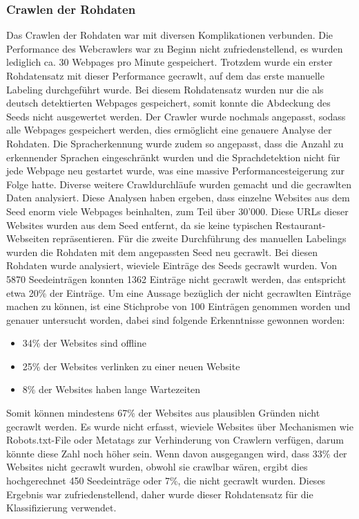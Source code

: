 \subsubsection{Crawlen der Rohdaten}
Das Crawlen der Rohdaten war mit diversen Komplikationen verbunden.
Die Performance des Webcrawlers war zu Beginn nicht zufriedenstellend, es wurden lediglich ca. 30 Webpages pro Minute gespeichert.
Trotzdem wurde ein erster Rohdatensatz mit dieser Performance gecrawlt, auf dem das erste manuelle Labeling durchgeführt wurde.
Bei diesem Rohdatensatz wurden nur die als deutsch detektierten Webpages gespeichert, somit konnte die Abdeckung des Seeds nicht ausgewertet werden.
Der Crawler wurde nochmals angepasst, sodass alle Webpages gespeichert werden, dies ermöglicht eine genauere Analyse der Rohdaten.
Die Spracherkennung wurde zudem so angepasst, dass die Anzahl zu erkennender Sprachen eingeschränkt wurden und die Sprachdetektion nicht für jede Webpage neu gestartet wurde, was eine massive Performancesteigerung zur Folge hatte.
Diverse weitere Crawldurchläufe wurden gemacht und die gecrawlten Daten analysiert.
Diese Analysen haben ergeben, dass einzelne Websites aus dem Seed enorm viele Webpages beinhalten, zum Teil über 30'000.
Diese URLs dieser Websites wurden aus dem Seed entfernt, da sie keine typischen Restaurant-Webseiten repräsentieren.
Für die zweite Durchführung des manuellen Labelings wurden die Rohdaten mit dem angepassten Seed neu gecrawlt.
Bei diesen Rohdaten wurde analysiert, wieviele Einträge des Seeds gecrawlt wurden.
Von 5870 Seedeinträgen konnten 1362 Einträge nicht gecrawlt werden, das entspricht etwa 20\% der Einträge.
Um eine Aussage bezüglich der nicht gecrawlten Einträge machen zu können, ist eine Stichprobe von 100 Einträgen genommen worden und genauer untersucht worden, dabei sind folgende Erkenntnisse gewonnen worden:
\begin{itemize}
	\item 34\% der Websites sind offline
	\item 25\% der Websites verlinken zu einer neuen Website
	\item 8\% der Websites haben lange Wartezeiten
\end{itemize}
Somit können mindestens 67\% der Websites aus plausiblen Gründen nicht gecrawlt werden.
Es wurde nicht erfasst, wieviele Websites über Mechanismen wie Robots.txt-File oder Metatags zur Verhinderung von Crawlern verfügen, darum könnte diese Zahl noch höher sein.
Wenn davon ausgegangen wird, dass 33\% der Websites nicht gecrawlt wurden, obwohl sie crawlbar wären, ergibt dies hochgerechnet 450 Seedeinträge oder 7\%, die nicht gecrawlt wurden.
Dieses Ergebnis war zufriedenstellend, daher wurde dieser Rohdatensatz für die Klassifizierung verwendet.

